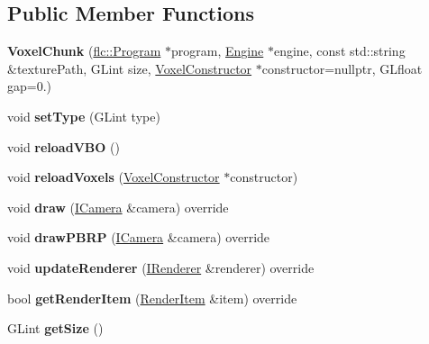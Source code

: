 \subsection*{Public Member Functions}
\begin{DoxyCompactItemize}
\item 
\mbox{\label{classflw_1_1flf_1_1VoxelChunk_a0bfa0da98e8545a7ca325f80efebf473}} 
{\bfseries Voxel\+Chunk} (\hyperlink{classflw_1_1flc_1_1Program}{flc\+::\+Program} $\ast$program, \hyperlink{classflw_1_1Engine}{Engine} $\ast$engine, const std\+::string \&texture\+Path, G\+Lint size, \hyperlink{classflw_1_1flf_1_1VoxelConstructor}{Voxel\+Constructor} $\ast$constructor=nullptr, G\+Lfloat gap=0.)
\item 
\mbox{\label{classflw_1_1flf_1_1VoxelChunk_aed73af0ac1484a5390b42601b3c869be}} 
void {\bfseries set\+Type} (G\+Lint type)
\item 
\mbox{\label{classflw_1_1flf_1_1VoxelChunk_a1af997eab931244f7387fcf961e7a9ed}} 
void {\bfseries reload\+V\+BO} ()
\item 
\mbox{\label{classflw_1_1flf_1_1VoxelChunk_a369bdf2852ddf649a5732bf197391ed2}} 
void {\bfseries reload\+Voxels} (\hyperlink{classflw_1_1flf_1_1VoxelConstructor}{Voxel\+Constructor} $\ast$constructor)
\item 
\mbox{\label{classflw_1_1flf_1_1VoxelChunk_a6378fa9aabff73ae9ce0a8cfa31dd29f}} 
void {\bfseries draw} (\hyperlink{classflw_1_1flf_1_1ICamera}{I\+Camera} \&camera) override
\item 
\mbox{\label{classflw_1_1flf_1_1VoxelChunk_a74caf1ee59229bd42aecd5e547806b26}} 
void {\bfseries draw\+P\+B\+RP} (\hyperlink{classflw_1_1flf_1_1ICamera}{I\+Camera} \&camera) override
\item 
\mbox{\label{classflw_1_1flf_1_1VoxelChunk_a838a8d066f2c549b02df8d4ce5e74453}} 
void {\bfseries update\+Renderer} (\hyperlink{classflw_1_1flf_1_1IRenderer}{I\+Renderer} \&renderer) override
\item 
\mbox{\label{classflw_1_1flf_1_1VoxelChunk_a17bcd385a0b401fd51f70e3db01fbb81}} 
bool {\bfseries get\+Render\+Item} (\hyperlink{structflw_1_1flf_1_1RenderItem}{Render\+Item} \&item) override
\item 
\mbox{\label{classflw_1_1flf_1_1VoxelChunk_ad6c2aaabd515bfccd852144859f58532}} 
G\+Lint {\bfseries get\+Size} ()
\end{DoxyCompactItemize}
